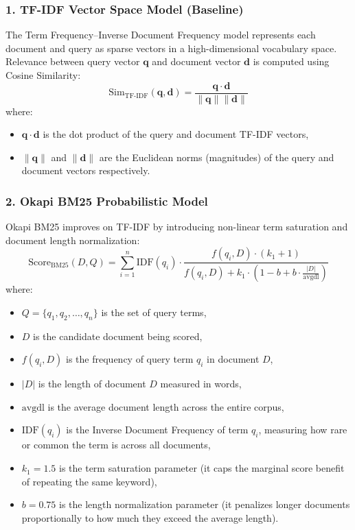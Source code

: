 \documentclass[11pt,a4paper]{article}
\begin{document}
\subsubsection{1. TF-IDF Vector Space Model (Baseline)}
The Term Frequency--Inverse Document Frequency model represents each document and query as sparse vectors in a high-dimensional vocabulary space. Relevance between query vector $\mathbf{q}$ and document vector $\mathbf{d}$ is computed using Cosine Similarity:
\begin{equation}
\text{Sim}_{\text{TF-IDF}}(\mathbf{q}, \mathbf{d}) = \frac{\mathbf{q} \cdot \mathbf{d}}{\|\mathbf{q}\| \|\mathbf{d}\|}
\end{equation}
where:
\begin{itemize}[leftmargin=1.5em, topsep=2pt]
    \item $\mathbf{q} \cdot \mathbf{d}$ is the dot product of the query and document TF-IDF vectors,
    \item $\|\mathbf{q}\|$ and $\|\mathbf{d}\|$ are the Euclidean norms (magnitudes) of the query and document vectors respectively.
\end{itemize}

\subsubsection{2. Okapi BM25 Probabilistic Model}
Okapi BM25 improves on TF-IDF by introducing non-linear term saturation and document length normalization:
\begin{equation}
\text{Score}_{\text{BM25}}(D, Q) = \sum_{i=1}^{n} \text{IDF}(q_i) \cdot \frac{f(q_i, D) \cdot (k_1 + 1)}{f(q_i, D) + k_1 \cdot \left(1 - b + b \cdot \frac{|D|}{\text{avgdl}}\right)}
\end{equation}
where:
\begin{itemize}[leftmargin=1.5em, topsep=2pt]
    \item $Q = \{q_1, q_2, \dots, q_n\}$ is the set of query terms,
    \item $D$ is the candidate document being scored,
    \item $f(q_i, D)$ is the frequency of query term $q_i$ in document $D$,
    \item $|D|$ is the length of document $D$ measured in words,
    \item $\text{avgdl}$ is the average document length across the entire corpus,
    \item $\text{IDF}(q_i)$ is the Inverse Document Frequency of term $q_i$, measuring how rare or common the term is across all documents,
    \item $k_1 = 1.5$ is the term saturation parameter (it caps the marginal score benefit of repeating the same keyword),
    \item $b = 0.75$ is the length normalization parameter (it penalizes longer documents proportionally to how much they exceed the average length).
\end{itemize}
\end{document}
